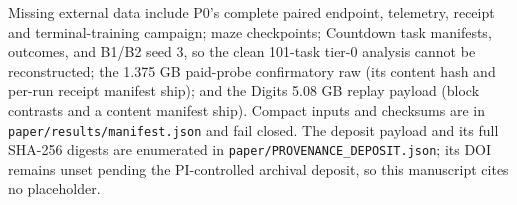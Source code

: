 Missing external data include P0's complete paired endpoint, telemetry,
receipt and terminal-training campaign; maze checkpoints; Countdown task manifests,
outcomes, and B1/B2 seed 3, so the clean 101-task tier-0 analysis cannot be
reconstructed; the 1.375 GB paid-probe confirmatory raw (its
content hash and per-run receipt manifest ship); and the Digits 5.08 GB replay payload (block
contrasts and a content manifest ship). Compact inputs and checksums are in
\texttt{paper/results/manifest.json} and fail closed. The deposit payload and
its full SHA-256 digests are enumerated in
\texttt{paper/PROVENANCE\_DEPOSIT.json}; its DOI remains unset pending the
PI-controlled archival deposit, so this manuscript cites no placeholder.
